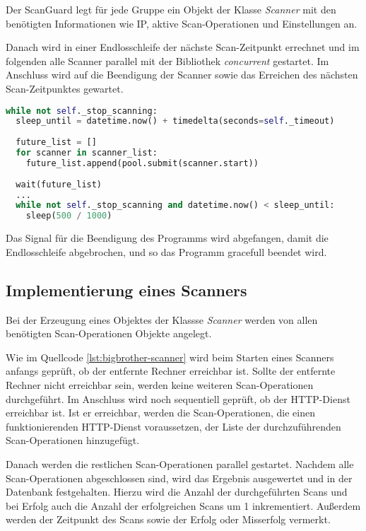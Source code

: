 Der ScanGuard legt für jede Gruppe ein Objekt der Klasse \textit{Scanner} mit den benötigten Informationen wie IP, aktive Scan-Operationen und Einstellungen an.

Danach wird in einer Endlosschleife der nächste Scan-Zeitpunkt errechnet und im folgenden alle Scanner parallel mit der Bibliothek \textit{concurrent} gestartet. Im Anschluss wird auf die Beendigung der Scanner sowie das Erreichen des nächsten Scan-Zeitpunktes gewartet.

\begin{lstlisting}[language=Python, frame=single, caption={Big Brother ScanGuard}, captionpos=b, label={lst:bigbrother-scanguard}]
while not self._stop_scanning:
  sleep_until = datetime.now() + timedelta(seconds=self._timeout)
  
  future_list = []
  for scanner in scanner_list:
    future_list.append(pool.submit(scanner.start))
    
  wait(future_list)
  ...
  while not self._stop_scanning and datetime.now() < sleep_until:
    sleep(500 / 1000)
\end{lstlisting}

Das Signal für die Beendigung des Programms wird abgefangen, damit die Endlosschleife abgebrochen, und so das Programm gracefull beendet wird.

\subsection{Implementierung eines Scanners}
Bei der Erzeugung eines Objektes der Klassse \textit{Scanner} werden von allen benötigten Scan-Operationen Objekte angelegt.

Wie im Quellcode \autoref{lst:bigbrother-scanner} wird beim Starten eines Scanners anfangs geprüft, ob der entfernte Rechner erreichbar ist. Sollte der entfernte Rechner nicht erreichbar sein, werden keine weiteren Scan-Operationen durchgeführt. Im Anschluss wird noch sequentiell geprüft, ob der HTTP-Dienst erreichbar ist. Ist er erreichbar, werden die Scan-Operationen, die einen funktionierenden HTTP-Dienst voraussetzen, der Liste der durchzuführenden Scan-Operationen hinzugefügt.

Danach werden die restlichen Scan-Operationen parallel gestartet. Nachdem alle \linebreak Scan-Operationen abgeschlossen sind, wird das Ergebnis ausgewertet und in der Datenbank festgehalten. Hierzu wird die Anzahl der durchgeführten Scans und bei Erfolg auch die Anzahl der erfolgreichen Scans um 1 inkrementiert. Außerdem werden der Zeitpunkt des Scans sowie der Erfolg oder Misserfolg vermerkt.

